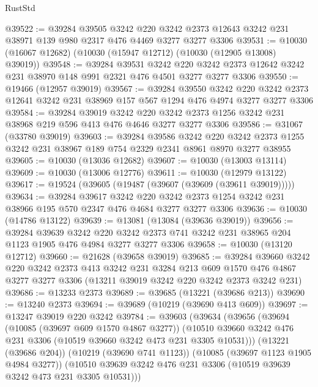 \begin{lexlean}{RustStd}
\begin{coremodule}
@39522 := @39284
    @39505
    @3242
    @220
    @3242
    @2373
    @12643
    @3242
    @231
    @38971
    @139
    @980
    @2317
    @476
    @4469
    @3277
    @3277
    @3306
@39531 := @10030 (@16067 @12682) (@10030 (@15947 @12712) (@10030 (@12905 @13008) @39019))
@39548 := @39284
    @39531
    @3242
    @220
    @3242
    @2373
    @12642
    @3242
    @231
    @38970
    @148
    @991
    @2321
    @476
    @4501
    @3277
    @3277
    @3306
@39550 := @19466 (@12957 @39019)
@39567 := @39284
    @39550
    @3242
    @220
    @3242
    @2373
    @12641
    @3242
    @231
    @38969
    @157
    @567
    @1294
    @476
    @4974
    @3277
    @3277
    @3306
@39584 := @39284
    @39019
    @3242
    @220
    @3242
    @2373
    @1256
    @3242
    @231
    @38968
    @219
    @596
    @413
    @476
    @4646
    @3277
    @3277
    @3306
@39586 := @31067 (@33780 @39019)
@39603 := @39284
    @39586
    @3242
    @220
    @3242
    @2373
    @1255
    @3242
    @231
    @38967
    @189
    @754
    @2329
    @2341
    @8961
    @8970
    @3277
    @38955
@39605 := @10030 (@13036 @12682)
@39607 := @10030 (@13003 @13114)
@39609 := @10030 (@13006 @12776)
@39611 := @10030 (@12979 @13122)
@39617 := @19524 (@39605 (@19487 (@39607 (@39609 (@39611 @39019)))))
@39634 := @39284
    @39617
    @3242
    @220
    @3242
    @2373
    @1254
    @3242
    @231
    @38966
    @195
    @570
    @2347
    @476
    @4684
    @3277
    @3277
    @3306
@39636 := @10030 (@14786 @13122)
@39639 := @13081 (@13084 (@39636 @39019))
@39656 := @39284
    @39639
    @3242
    @220
    @3242
    @2373
    @741
    @3242
    @231
    @38965
    @204
    @1123
    @1905
    @476
    @4984
    @3277
    @3277
    @3306
@39658 := @10030 (@13120 @12712)
@39660 := @21628 (@39658 @39019)
@39685 := @39284
    @39660
    @3242
    @220
    @3242
    @2373
    @413
    @3242
    @231
    @3284
    @213
    @609
    @1570
    @476
    @4867
    @3277
    @3277
    @3306
    (@13211 @39019 @3242 @220 @3242 @2373 @3242 @231)
@39686 := @13233 @2373
@39689 := @39685 (@13221 (@39686 @213))
@39690 := @13240 @2373
@39694 := @39689 (@10219 (@39690 @413 @609))
@39697 := @13247 @39019 @220 @3242
@39784 := @39603
    (@39634
      (@39656
        (@39694
          (@10085 (@39697 @609 @1570 @4867 @3277))
          (@10510 @39660 @3242 @476 @231 @3306 (@10519 @39660 @3242 @473 @231 @3305 @10531)))
        (@13221 (@39686 @204))
        (@10219 (@39690 @741 @1123))
        (@10085 (@39697 @1123 @1905 @4984 @3277))
        (@10510 @39639 @3242 @476 @231 @3306 (@10519 @39639 @3242 @473 @231 @3305 @10531)))

\end{coremodule}
\end{lexlean}

